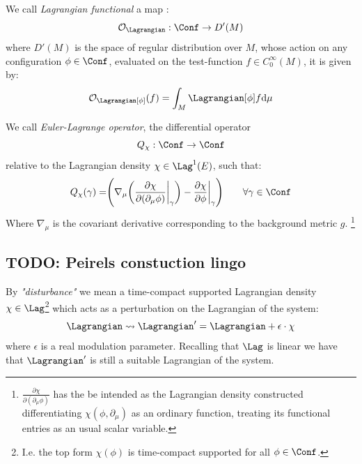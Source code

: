\documentclass[a4paper,10pt]{report}
\begin{document}
	\begin{definition}\label{Def:LagrangianFunctionals}
		We call \emph{Lagrangian functional} a map :
		\begin{displaymath}
			\mathcal{O}_\Lagrangian : \Conf \rightarrow D'(M)
		\end{displaymath}
		where  $D'(M)$ is the space of regular distribution over $M$, %
		whose action on any configuration $\phi \in \Conf$, evaluated on the test-function $f \in C^\infty_0(M)$, it is given by:
		\begin{displaymath}
			\mathcal{O}_\Lagrangian [\phi] (f) = \int_M \Lagrangian [\phi] f \textrm{d}\mu
		\end{displaymath}
	\end{definition}

	\begin{definition}
		We call \emph{Euler-Lagrange operator}, the  differential operator
		\begin{displaymath}
			Q_\chi : \Conf \rightarrow \Conf
		\end{displaymath}
		relative to the Lagrangian density $\chi \in \Lag^1(E)$, such that:
		\begin{equation}
			Q_\chi (\gamma) = \Biggr( \nabla_\mu \biggr( \frac{\partial \chi}{\partial(\partial_\mu \phi)} \biggr\vert_\gamma \biggr) - \frac{\partial \chi}{\partial \phi}\biggr\vert_\gamma \Biggr) \qquad \forall \gamma \in \Conf
		\end{equation}
		Where $\nabla_\mu$ is the covariant derivative corresponding to the background metric $g$.
		\footnote{$\frac{\partial \chi}{\partial(\partial_\mu \phi)}$ has the be intended as the Lagrangian density constructed differentiating $\chi(\phi, \partial_\mu)$ as an ordinary function, treating its functional entries as an usual scalar variable.}
	\end{definition}

	\subsection{TODO: Peirels constuction lingo}

	\begin{definition}[Disturbance]
		By \emph{"disturbance"} we mean a time-compact supported Lagrangian density $\chi \in \Lag$\footnote{I.e. the top form $\chi(\phi)$ is time-compact supported for all $\phi \in \Conf$.} which acts as a perturbation on the Lagrangian of the system:
		\begin{displaymath}
			\Lagrangian \rightsquigarrow \Lagrangian' = \Lagrangian + \epsilon\cdot \chi
		\end{displaymath}
		where $\epsilon$  is a real modulation parameter.
		Recalling that $\Lag$ is linear we have that $\Lagrangian'$ is still a suitable Lagrangian of the system.
	\end{definition}
\end{document}
